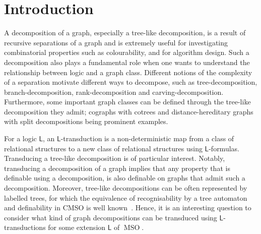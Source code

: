 \documentclass{lmcs} %
\newcommand{\MSO}{\ensuremath{\operatorname{MSO}}\xspace}
\newcommand{\CMSO}[1][]{\ensuremath{\C[#1]{\!\!}\MSO}\xspace}
\newcommand{\C}[1][]{\ensuremath{\operatorname{C}_{#1}}\xspace}
\begin{document}
\begin{abstract}
  \noindent We show that given a graph $G$ we can \CMSO-transduce its modular decomposition, its split decomposition and its bi-join decomposition. This improves results by Courcelle [Logical Methods in Computer Science, 2006] who gave such transductions using order-invariant \MSO, a strictly more expressive logic than \CMSO. Our methods more generally yield \CMSO[2]-transductions of the canonical decomposition of weakly-partitive set systems and weakly-bipartitive systems of bipartitions.
\end{abstract}

\maketitle


\section{Introduction}
A decomposition of a graph, especially a tree-like decomposition, is a result of recursive separations of a graph
and is extremely useful for investigating combinatorial properties such as colourability, and for algorithm design. Such a decomposition also plays a fundamental role when one wants to understand the relationship between logic and a graph class.
Different notions of the complexity of a separation motivate different ways to decompose, such as tree-decomposition, branch-decomposition, rank-decomposition and carving-decomposition.
Furthermore, some important graph classes can be defined through the tree-like decomposition they admit;
cographs with cotrees and distance-hereditary graphs with split decompositions being prominent examples.


For a logic $\mathsf{L}$,
an $\mathsf{L}$-transduction 
is a non-deterministic map from a class of relational structures to a new class of relational structures using $\mathsf{L}$-formulas. Transducing
a tree-like decomposition is of particular interest.
Notably, transducing a decomposition of a graph implies that any property that is definable using a decomposition, is also definable on graphs that admit such a decomposition.
Moreover, tree-like decompositions can be often represented by labelled trees, for which the equivalence of recognisability by a tree automaton and definability in CMSO is well known~\cite{TMSOLOG1}.
Hence, it is an interesting question to consider what kind of graph decompositions can be transduced using $\mathsf{L}$-transductions for some extension $\mathsf{L}$ of \MSO.
\end{document}
